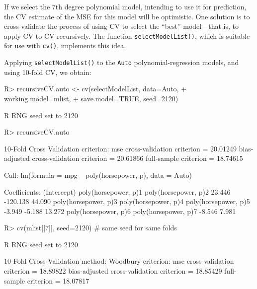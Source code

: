 \documentclass[
]{jss}
\begin{document}
If we select the 7th degree polynomial model, intending to use it for
prediction, the CV estimate of the MSE for this model will be
optimistic. One solution is to cross-validate the process of using CV to
select the ``best'' model---that is, to apply CV to CV recursively. The
function \texttt{selectModelList()}, which is suitable for use with
\texttt{cv()}, implements this idea.

Applying \texttt{selectModelList()} to the \texttt{Auto}
polynomial-regression models, and using 10-fold CV, we obtain:

\begin{CodeChunk}
\begin{CodeInput}
R> recursiveCV.auto <- cv(selectModelList, data=Auto, 
+                        working.model=mlist,
+                        save.model=TRUE, seed=2120)
\end{CodeInput}
\begin{CodeOutput}
R RNG seed set to 2120
\end{CodeOutput}
\begin{CodeInput}
R> recursiveCV.auto
\end{CodeInput}
\begin{CodeOutput}
10-Fold Cross Validation
criterion: mse
cross-validation criterion = 20.01249
bias-adjusted cross-validation criterion = 20.61866
full-sample criterion = 18.74615 
\end{CodeOutput}
\begin{CodeOutput}

Call:
lm(formula = mpg ~ poly(horsepower, p), data = Auto)

Coefficients:
         (Intercept)  poly(horsepower, p)1  poly(horsepower, p)2  
              23.446              -120.138                44.090  
poly(horsepower, p)3  poly(horsepower, p)4  poly(horsepower, p)5  
              -3.949                -5.188                13.272  
poly(horsepower, p)6  poly(horsepower, p)7  
              -8.546                 7.981  
\end{CodeOutput}
\begin{CodeInput}
R> cv(mlist[[7]], seed=2120) # same seed for same folds
\end{CodeInput}
\begin{CodeOutput}
R RNG seed set to 2120
\end{CodeOutput}
\begin{CodeOutput}
10-Fold Cross Validation
method: Woodbury
criterion: mse
cross-validation criterion = 18.89822
bias-adjusted cross-validation criterion = 18.85429
full-sample criterion = 18.07817 
\end{CodeOutput}
\end{CodeChunk}
\end{document}
